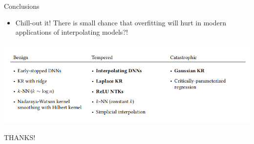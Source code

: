 \documentclass[aspectratio=169]{beamer}
\begin{document}
\begin{frame}{Conclusions}
  \centering
  \begin{itemize}
    \item Chill-out it! There is small chance that overfitting will hurt in modern applications of interpolating models?!
  \end{itemize}
  \includegraphics[width=\textwidth]{Figures/conclusions.png}
\end{frame}

\begin{frame}
    \color{Pink} 
    \centering
     THANKS!
\end{frame}
\end{document}
